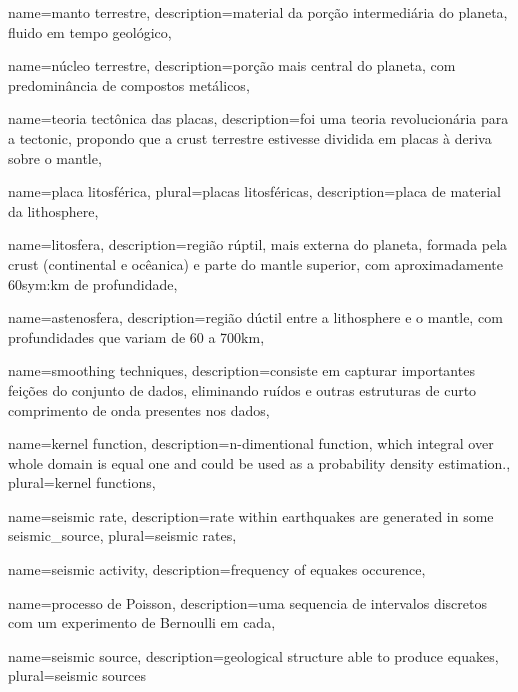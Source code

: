 {
	name={manto terrestre},
	description={material da por{ç}{ã}o intermediária do planeta, 
		fluido em tempo geológico},
}

{
	name={n{ú}cleo terrestre},
	description={por{ç}{ã}o mais central do planeta, com predomin{â}ncia de compostos metálicos},
}

{
	name={teoria tect{ô}nica das placas},
	description={foi uma teoria revolucionária para a \gls{tectonic},
				propondo que a \gls{crust} terrestre estivesse dividida 
				em placas {à} deriva sobre o \gls{mantle}},
}


{
	name={placa litosf{é}rica},
	plural={placas litosf{é}ricas},
	description={placa de material da \gls{lithosphere}},
}


{
	name={litosfera},
	description={região rúptil, mais externa do planeta, formada pela \gls{crust} 
		(continental e ocêanica) e parte do \gls{mantle} superior, com aproximadamente 
		60\gls*{sym:km} de profundidade},
}


{
	name={astenosfera},
	description={região dúctil entre a \gls{lithosphere} e o \gls{mantle},
				com profundidades que variam de 60 a 700km},
}

{
	name={smoothing techniques},
	description={consiste em capturar importantes feições do conjunto de dados,
				 eliminando ruídos e outras estruturas de curto comprimento de onda
				 presentes nos dados},
}

{
	name={kernel function},
	description={n-dimentional function, which integral over whole domain is equal one and could be used as a probability density estimation.},
	plural={kernel functions},
}

{
	name={seismic rate},
	description={rate within earthquakes are generated in some \gls{seismic_source}},
	plural={seismic rates},
}

{
	name={seismic activity},
	description={frequency of \glspl{equake} occurence},
}

{
	name={processo de Poisson},
	description={uma sequencia de intervalos discretos com um experimento de Bernoulli em cada},
}

{
	name={seismic source},
	description={geological structure able to produce \glspl{equake}},
	plural={seismic sources}
}

